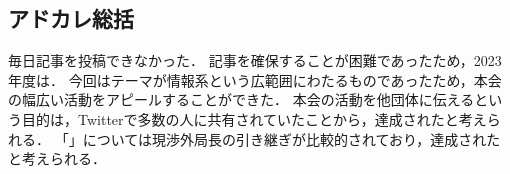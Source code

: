 \subsection*{アドカレ総括}


毎日記事を投稿できなかった．
記事を確保することが困難であったため，2023年度は．
今回はテーマが情報系という広範囲にわたるものであったため，本会の幅広い活動をアピールすることができた．
本会の活動を他団体に伝えるという目的は，Twitterで多数の人に共有されていたことから，達成されたと考えられる．
「」については現渉外局長の引き継ぎが比較的されており，達成されたと考えられる．
